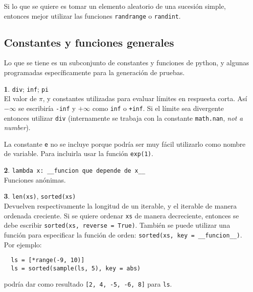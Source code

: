 \documentclass[12pt]{article}
\theoremstyle{definition}
\newtheorem{funcion}{}[section]
\begin{document}
Si lo que se quiere es tomar un elemento aleatorio de una sucesión simple, entonces mejor utilizar las funciones \verb|randrange| o \verb|randint|. 

\subsection{Constantes y funciones generales}
Lo que se tiene es un subconjunto de constantes y funciones de python, y algunas programadas espec\'ificamente para la generaci\'on de pruebas.

\begin{funcion}
\verb|div|; \verb|inf|; \verb|pi| \\[1ex]
  El valor de $\pi$, y constantes utilizadas para evaluar l\'imites en respuesta corta. As\'i $-\infty$ se escribir\'ia \verb|-inf| y $+\infty$ como \verb|inf| o \verb|+inf|. Si el l\'imite sea divergente entonces utilizar \verb|div| (internamente se trabaja con la constante \verb|math.nan|, \emph{not a number}).

  La constante \verb|e| no se incluye porque podr\'ia ser muy f\'acil utilizarlo como nombre de variable. Para incluirla usar la funci\'on \verb|exp(1)|.
\end{funcion}

\begin{funcion}
  \verb|lambda x: __funcion que depende de x__| \\[1ex]
  Funciones an\'onimas.
\end{funcion}

\begin{funcion}
  \verb|len(xs)|, \verb|sorted(xs)| \\[1ex]
  Devuelven respectivamente la longitud de un iterable, y el iterable de manera ordenada creciente. Si se quiere ordenar \verb|xs| de manera decreciente, entonces se debe escribir \verb|sorted(xs, reverse = True)|. Tambi\'en se puede utilizar una funci\'on para especificar la funci\'on de orden: \verb|sorted(xs, key = __funcion__)|. Por ejemplo:
  \begin{verbatim}
  ls = [*range(-9, 10)]
  ls = sorted(sample(ls, 5), key = abs)
  \end{verbatim}
  podr\'ia dar como resultado \verb|[2, 4, -5, -6, 8]| para \verb|ls|.
\end{funcion}
\end{document}
